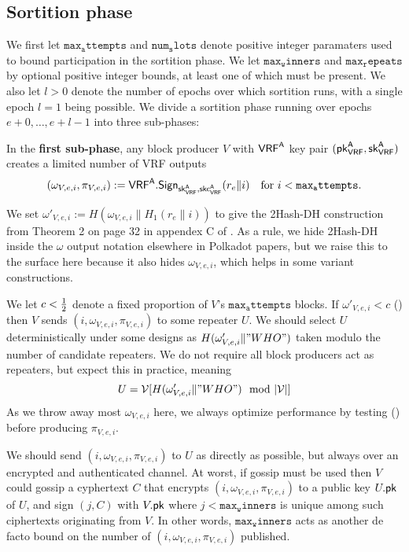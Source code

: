 \subsection{Sortition phase}\label{subsec:sortition_phase}
\newcommand{\vrfaattemptsbound}{\mathtt{max_attempts}} %
\newcommand{\vrfawinnersbound}{\mathtt{max_winners}} %
\newcommand{\vrfarepeatbound}{\mathtt{max_repeats}} %
\newcommand{\vrfaslotsbound}{\mathtt{num_slots}} %

We first let $\vrfaattemptsbound$ and $\vrfaslotsbound$ denote positive integer paramaters used to bound participation in the sortition phase.  We let $\vrfawinnersbound$ and $\vrfarepeatbound$ by optional positive integer bounds, at least one of which must be present.  We also let $l>0$ denote the number of epochs over which sortition runs, with a single epoch $l=1$ being possible.  We divide a sortition phase running over epochs $e+0,\ldots,e+l-1$ into three sub-phases:  

In the {\bf first sub-phase}, any block producer $V$ with $\mathsf{VRF}^{\mathsf{A}}$ key pair $(\mathsf{pk}_{\mathsf{VRF}}^{\mathsf{A}},\mathsf{sk}_{\mathsf{VRF}}^{\mathsf{A}})$ creates a limited number of VRF outputs 
$$ (\omega_{V,e,i},\pi_{V,e,i}) := \VRFa.\Sign_{\skvrfa,\skcvrfa}(r_e \| i) \quad \textrm{for $i < \vrfaattemptsbound$.} $$

We set $\omega'_{V,e,i} := H(\omega_{V,e,i} \| H_1(r_e \| i))$ to give the 2Hash-DH construction from Theorem 2 on page 32 in appendex C of \cite{Praos}.  As a rule, we hide 2Hash-DH inside the $\omega$ output notation elsewhere in Polkadot papers, but we raise this to the surface here because it also hides $\omega_{V,e,i}$, which helps in some variant constructions.

We let $c < {1\over2}$ denote a fixed proportion of $V$'s $\vrfaattemptsbound$ blocks.  If $\omega'_{V,e,i} < c$ (\dag) then $V$ sends $(i,\omega_{V,e,i},\pi_{V,e,i})$ to some repeater $U$.  We should select $U$ deterministically under some designs as $H(\omega'_{V,e,i} \| "WHO")$ taken modulo the number of candidate repeaters.  We do not require all block producers act as repeaters, but expect this in practice, meaning
$$ U = \mathcal{V}[H(\omega'_{V,e,i} \| "WHO") \mod |\mathcal{V}|] $$
As we throw away most $\omega_{V,e,i}$ here, we always optimize performance by testing (\dag) before producing $\pi_{V,e,i}$.  

We should send $(i,\omega_{V,e,i},\pi_{V,e,i})$ to $U$ as directly as possible, but always over an encrypted and authenticated channel.  At worst, if gossip must be used then $V$ could gossip a cyphertext $C$ that encrypts $(i,\omega_{V,e,i},\pi_{V,e,i})$ to a public key $U.\mathsf{pk}$ of $U$, and sign $(j,C)$ with $V.\mathsf{pk}$ where $j < \vrfawinnersbound$ is unique among such ciphertexts originating from $V$.  In other words, $\vrfawinnersbound$ acts as another de facto bound on the number of $(i,\omega_{V,e,i},\pi_{V,e,i})$ published.  

